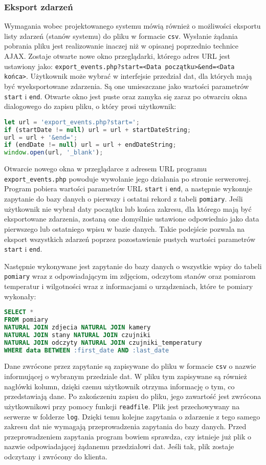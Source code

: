 \documentclass[a4paper,11pt,twoside]{article}
\begin{document}
\subsubsection{Eksport zdarzeń}
Wymagania wobec projektowanego systemu mówią również o możliwości eksportu listy zdarzeń (stanów systemu) do pliku w formacie \texttt{csv}. Wysłanie żądania pobrania pliku jest realizowanie inaczej niż w opisanej poprzednio technice AJAX. Zostaje otwarte nowe okno przeglądarki, którego adres URL jest ustawiony jako: \texttt{export{\_}events.php?start=<Data początku>{\&}end=<Data końca>}. Użytkownik może wybrać w interfejsie przedział dat, dla których mają być wyeksportowane zdarzenia. Są one umieszczane jako wartości parametrów \texttt{start} i \texttt{end}. Otwarte okno jest puste oraz zamyka się zaraz po otwarciu okna dialogowego do zapisu pliku, o który prosi użytkownik:
\begin{lstlisting}[language=JavaScript]
let url = 'export_events.php?start=';
if (startDate != null) url = url + startDateString;
url = url + '&end=';
if (endDate != null) url = url + endDateString;
window.open(url, '_blank');
\end{lstlisting}

Otwarcie nowego okna w przeglądarce z adresem URL programu \texttt{export{\_}events.php} powoduje wywołanie jego działania po stronie serwerowej. Program pobiera wartości parametrów URL \texttt{start} i \texttt{end}, a następnie wykonuje zapytanie do bazy danych o pierwszy i ostatni rekord z tabeli \texttt{pomiary}. Jeśli użytkownik nie wybrał daty początku lub końca zakresu, dla którego mają być eksportowane zdarzenia, zostaną one domyślnie ustawione odpowiednio jako data pierwszego lub ostatniego wpisu w bazie danych. Takie podejście pozwala na eksport wszystkich zdarzeń poprzez pozostawienie pustych wartości parametrów \texttt{start} i \texttt{end}.

Następnie wykonywane jest zapytanie do bazy danych o wszystkie wpisy do tabeli \texttt{pomiary} wraz z odpowiadającym im zdjęciom, odczytom stanów oraz pomiarom temperatur i wilgotności wraz z informacjami o urządzeniach, które te pomiary wykonały:
\begin{lstlisting}[language=SQL]
SELECT *
FROM pomiary 
NATURAL JOIN zdjecia NATURAL JOIN kamery
NATURAL JOIN stany NATURAL JOIN czujniki
NATURAL JOIN odczyty NATURAL JOIN czujniki_temperatury
WHERE data BETWEEN :first_date AND :last_date
\end{lstlisting}
Dane zwrócone przez zapytanie są zapisywane do pliku w formacie \texttt{csv} o nazwie informującej o wybranym przedziale dat. W pliku tym zapisywane są również nagłówki kolumn, dzięki czemu użytkownik otrzyma informację o tym, co przedstawiają dane. Po zakończeniu zapisu do pliku, jego zawartość jest zwrócona użytkownikowi przy pomocy funkcji \texttt{readfile}. Plik jest przechowywany na serwerze w folderze \texttt{log}. Dzięki temu kolejne zapytania o zdarzenie z tego samego zakresu dat nie wymagają przeprowadzenia zapytania do bazy danych. Przed przeprowadzeniem zapytania program bowiem sprawdza, czy istnieje już plik o nazwie odpowiadającej żądanemu przedziałowi dat. Jeśli tak, plik zostaje odczytany i zwrócony do klienta.
\end{document}

